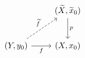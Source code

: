 \documentclass{article}
\begin{document}
    \begin{equation*}
        \begin{tikzcd}[row sep = 0.35in]
            & (\widetilde{X},\widetilde{x}_0) \ar[d, "p"] \\
            \tpl{Y,y_0} \ar[ur, "\widetilde{f}", dashed] \ar[r, "f"'] & \tpl{X,x_0}
        \end{tikzcd}
    \end{equation*}
\end{document}
